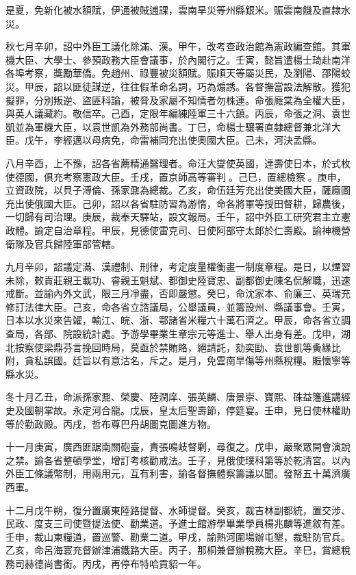 \begin{pinyinscope}
是夏，免新化被水額賦，伊通被賊逋課，雲南旱災等州縣銀米。賑雲南饑及直隸水災。

秋七月辛卯，詔中外臣工議化除滿、漢。甲午，改考查政治館為憲政編查館。其軍機大臣、大學士、參預政務大臣會議事，於內閣行之。壬寅，懿旨遣楊士琦赴南洋各埠考察，獎勵華僑。免趙州、祿豐被災額賦。賑順天等屬災民，及瀏陽、邵陽蛟災。甲辰，詔以匪徒謀逆，往往假革命名詞，巧為煽誘。各督撫當設法解散。獲犯擬罪，分別叛逆、盜匪科論，被脅及家屬不知情者勿株連。命張廕棠為全權大臣，與英人議藏約。敬信卒。己酉，定限年編練陸軍三十六鎮。丙辰，命張之洞、袁世凱並為軍機大臣，以袁世凱為外務部尚書。丁巳，命楊士驤署直隸總督兼北洋大臣。戊午，李經邁以母病免，命雷補同充出使奧國大臣。己未，河決孟縣。

八月辛酉，上不豫，詔各省薦精通醫理者。命汪大燮使英國，達壽使日本，於式枚使德國，俱充考察憲政大臣。壬戌，置京師高等審判。己巳，置總檢察。庚申，立資政院，以貝子溥倫、孫家鼐為總裁。乙亥，命伍廷芳充出使美國大臣，薩廕圖充出使俄國大臣。己卯，詔以各省駐防習為游惰，命各將軍等授田督耕，歸農後，一切歸有司治理。庚辰，裁奉天驛站，設文報局。壬午，詔中外臣工研究君主立憲政體。諭定自治章程。甲辰，見德使雷克司、日使阿部守太郎於仁壽殿。諭神機營衛隊及官兵歸陸軍部管轄。

九月辛卯，詔議定滿、漢禮制、刑律，考定度量權衡畫一制度章程。是日，以煙習未除，敕責莊親王載功、睿親王魁斌、都御史陸寶忠、副都御史陳名侃解職，迅速戒斷。並諭內外文武，限三月凈盡，否即嚴懲。癸巳，命沈家本、俞廉三、英瑞充修訂法律大臣。己亥，命各省立諮議局，公舉議員，並籌設州、縣議事會。壬寅，日本以水災來告糴，輸江、皖、浙、鄂諸省米糧六十萬石濟之。甲辰，命各省立調查局，各部、院設統計處。予游學畢業生章宗元等進士、舉人出身有差。戊申，湖北按察使梁鼎芬言挽回時局，莫亟於禁賄賂，絕請託，劾奕劻、袁世凱等夤緣比附，貪私誤國。廷旨以有意沽名，斥之。是月，免雲南旱傷等州縣稅糧。賑懷寧等縣水災。

冬十月乙丑，命派孫家鼐、榮慶、陸潤庠、張英麟、唐景崇、寶熙、硃益籓進講經史及國朝掌故。永定河合龍。戊辰，皇太后聖壽節，停筵宴。壬申，見日使林權助等於勤政殿。丙戌，哲布尊巴丹胡圖克圖進方物。

十一月庚寅，廣西匪踞南關砲臺，責張鳴岐督剿，尋復之。戊申，嚴聚眾開會演說之禁。諭各省整頓學堂，增訂考核勸戒法。壬子，見俄使璞科第等於乾清宮。以內外臣工條議幣制，用兩用元，互有利害，諭各督撫體察籌議以聞。發帑五十萬濟廣西軍。

十二月戊午朔，復分置廣東陸路提督、水師提督。癸亥，裁吉林副都統，置交涉、民政、度支三司使暨提法使、勸業道。予進士館游學畢業學員楊兆麟等進敘有差。壬申，裁山東糧道，置巡警、勸業二道。甲戌，諭熱河圍場辦屯墾，裁駐防官兵。乙亥，命呂海寰充督辦津浦鐵路大臣。丙子，那桐兼督辦稅務大臣。辛巳，賞總稅務司赫德尚書銜。丙戌，再停布特哈貢貂一年。


\end{pinyinscope}
